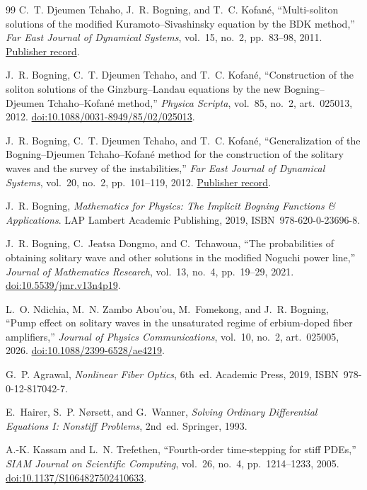 \documentclass[11pt]{article}
\begin{document}
\begin{thebibliography}{99}
C.~T. Djeumen Tchaho, J.~R. Bogning, and T.~C. Kofan\'e,
``Multi-soliton solutions of the modified Kuramoto--Sivashinsky equation by
the BDK method,'' \emph{Far East Journal of Dynamical Systems}, vol.~15,
no.~2, pp.~83--98, 2011.
\href{https://www.pphmj.com/journals/articles/786.htm}{Publisher record}.

J.~R. Bogning, C.~T. Djeumen Tchaho, and T.~C. Kofan\'e,
``Construction of the soliton solutions of the Ginzburg--Landau equations by
the new Bogning--Djeumen Tchaho--Kofan\'e method,'' \emph{Physica Scripta},
vol.~85, no.~2, art.~025013, 2012.
\href{https://doi.org/10.1088/0031-8949/85/02/025013}{doi:10.1088/0031-8949/85/02/025013}.

J.~R. Bogning, C.~T. Djeumen Tchaho, and T.~C. Kofan\'e,
``Generalization of the Bogning--Djeumen Tchaho--Kofan\'e method for the
construction of the solitary waves and the survey of the instabilities,''
\emph{Far East Journal of Dynamical Systems}, vol.~20, no.~2,
pp.~101--119, 2012.
\href{https://www.pphmj.com/journals/articles/1033.htm}{Publisher record}.

J.~R. Bogning, \emph{Mathematics for Physics: The Implicit Bogning Functions
\& Applications}. LAP Lambert Academic Publishing, 2019,
ISBN~978-620-0-23696-8.

J.~R. Bogning, C.~Jeatsa Dongmo, and C.~Tchawoua,
``The probabilities of obtaining solitary wave and other solutions in the
modified Noguchi power line,'' \emph{Journal of Mathematics Research},
vol.~13, no.~4, pp.~19--29, 2021.
\href{https://doi.org/10.5539/jmr.v13n4p19}{doi:10.5539/jmr.v13n4p19}.

L.~O. Ndichia, M.~N. Zambo Abou'ou, M.~Fomekong, and J.~R. Bogning,
``Pump effect on solitary waves in the unsaturated regime of erbium-doped
fiber amplifiers,'' \emph{Journal of Physics Communications}, vol.~10,
no.~2, art.~025005, 2026.
\href{https://doi.org/10.1088/2399-6528/ae4219}{doi:10.1088/2399-6528/ae4219}.

G.~P. Agrawal, \emph{Nonlinear Fiber Optics}, 6th~ed. Academic Press,
2019, ISBN~978-0-12-817042-7.

E.~Hairer, S.~P. N\o rsett, and G.~Wanner,
\emph{Solving Ordinary Differential Equations I: Nonstiff Problems},
2nd~ed. Springer, 1993.

A.-K. Kassam and L.~N. Trefethen,
``Fourth-order time-stepping for stiff PDEs,''
\emph{SIAM Journal on Scientific Computing}, vol.~26, no.~4,
pp.~1214--1233, 2005.
\href{https://doi.org/10.1137/S1064827502410633}{doi:10.1137/S1064827502410633}.


\end{thebibliography}
\end{document}
